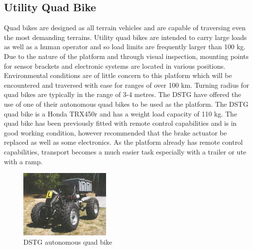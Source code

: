 \documentclass[main.tex]{subfiles}
\begin{document}
\subsection{Utility Quad Bike}
Quad bikes are designed as all terrain vehicles and are capable of traversing even the most demanding terrains. Utility quad bikes are intended to carry large loads as well as a human operator and so load limits are frequently larger than 100 kg. Due to the nature of the platform and through visual inspection, mounting points for sensor brackets and electronic systems are located in various positions.  Environmental conditions are of little concern to this platform which will be encountered and traversed with ease for ranges of over 100 km. Turning radius for quad bikes are typically in the range of 3-4 metres.
The DSTG have offered the use of one of their autonomous quad bikes to be used as the platform. The DSTG quad bike is a Honda TRX450r and has a weight load capacity of 110 kg. The quad bike has been previously fitted with remote control capabilities and is in good working condition, however \textcite{scheiner2011} recommended that the brake actuator be replaced as well as some electronics. As the platform already has remote control capabilities, transport becomes a much easier task especially with a trailer or ute with a ramp.
\begin{figure}[ht]
\includegraphics[width=0.4\textwidth]{4-ConceptDesign/2011quadbike.PNG}
\centering
\caption[DSTG autonomous quad bike]{DSTG autonomous quad bike \parencite{scheiner2011}} 
\end{figure}
\end{document}
